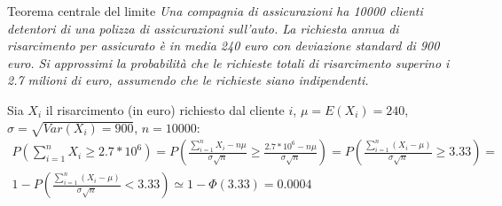 \begin{Example}{Teorema centrale del limite}{}
    \textit{Una compagnia di assicurazioni ha 10000 clienti detentori di una polizza di assicurazioni sull'auto. La richiesta annua di risarcimento per assicurato è in media 240 euro con deviazione standard di 900 euro. Si approssimi la probabilità che le richieste totali di risarcimento superino i 2.7 milioni di euro, assumendo che le richieste siano indipendenti.}

    Sia $X_i$ il risarcimento (in euro) richiesto dal cliente $i$, $\mu=E(X_i)=240$, $\sigma=\sqrt{Var(X_i)=900}$, $n=10000$:
    \begin{align*}
        P\left(\sum^n_{i=1}X_i\geq 2.7*10^6\right)=P\left(\frac{\sum^n_{i=1}X_i-n\mu}{\sigma\sqrt{n}}\geq \frac{2.7*10^6-n\mu}{\sigma\sqrt{n}}\right)=P\left(\frac{\sum^n_{i=1}(X_i-\mu)}{\sigma\sqrt{n}}\geq 3.33\right)=\\1-P\left(\frac{\sum^n_{i=1}(X_i-\mu)}{\sigma\sqrt{n}}< 3.33\right)\simeq 1-\Phi(3.33)=0.0004
    \end{align*}
\end{Example}